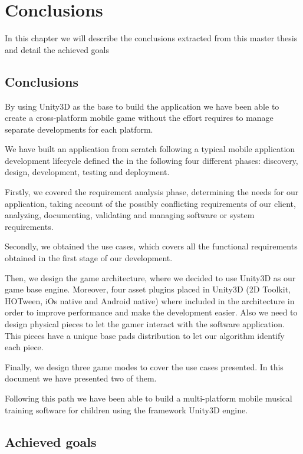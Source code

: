 \chapter{Conclusions}
\label{chap:conclusions}
\begin{chapterintro}
In this chapter we will describe the conclusions extracted from this master thesis and detail the achieved goals
\end{chapterintro}

\cleardoublepage
\section{Conclusions}

By using Unity3D as the base to build the application we have been able to create a cross-platform mobile game without the effort requires to manage separate developments for each platform.

We have built an application from scratch following a typical mobile application development lifecycle defined the in the following four different phases: discovery, design, development, testing and deployment.~\cite{vithani2014mod}

Firstly, we covered the requirement analysis phase, determining the needs for our application, taking account of the possibly conflicting requirements of our client, analyzing, documenting, validating and managing software or system requirements.~\cite{kotonya1998requirements}

Secondly, we obtained the use cases, which covers all the functional requirements obtained in the first stage of our development.

Then, we design the game architecture, where we decided to use Unity3D as our game base engine. Moreover, four asset plugins placed in Unity3D (2D Toolkit, HOTween, iOs native and Android native) where included in the architecture in order to improve performance and make the development easier. Also we need to design physical pieces to let the gamer interact with the software application. This pieces have a unique base pads distribution to let our algorithm identify each piece.

Finally, we design three game modes to cover the use cases presented. In this document we have presented two of them.

Following this path we have been able to build a multi-platform mobile musical training software for children using the framework Unity3D engine.

\section{Achieved goals}

